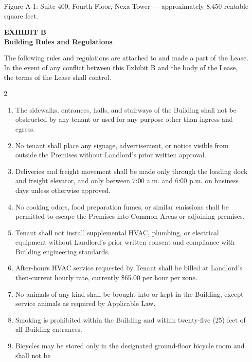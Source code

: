 \documentclass[10pt,a4paper]{scrreprt}
\newcommand{\exhibitheading}[2]{%
  \vspace{8pt}%
  \noindent\begin{tcolorbox}[colback=leasepaper,colframe=leasenavy,boxrule=1pt,arc=0pt,
    left=12pt,right=12pt,top=5pt,bottom=5pt,before skip=0pt,after skip=0pt]
    {\color{leasegold}\bfseries EXHIBIT #1}\\[1pt]
    {\color{leasenavy}\LARGE\bfseries #2}
  \end{tcolorbox}
  \vspace{4pt}%
}
\begin{document}
\vspace{-6pt}
\begin{center}
\small\color{leaseslate} Figure A-1: Suite 400, Fourth Floor, Nexa Tower --- approximately
8{,}450 rentable square feet.
\end{center}

\exhibitheading{B}{Building Rules and Regulations}

The following rules and regulations are attached to and made a part of the Lease. In the event
of any conflict between this Exhibit B and the body of the Lease, the terms of the Lease shall
control.

\begin{multicols}{2}
\begin{enumerate}[leftmargin=*,itemsep=2pt,label=\arabic*.]
\item The sidewalks, entrances, halls, and stairways of the Building shall not be obstructed by
  any tenant or used for any purpose other than ingress and egress.
\item No tenant shall place any signage, advertisement, or notice visible from outside the
  Premises without Landlord's prior written approval.
\item Deliveries and freight movement shall be made only through the loading dock and freight
  elevator, and only between 7:00 a.m. and 6:00 p.m. on business days unless otherwise approved.
\item No cooking odors, food preparation fumes, or similar emissions shall be permitted to
  escape the Premises into Common Areas or adjoining premises.
\item Tenant shall not install supplemental HVAC, plumbing, or electrical equipment without
  Landlord's prior written consent and compliance with Building engineering standards.
\item After-hours HVAC service requested by Tenant shall be billed at Landlord's then-current
  hourly rate, currently \$65.00 per hour per zone.
\item No animals of any kind shall be brought into or kept in the Building, except service
  animals as required by Applicable Law.
\item Smoking is prohibited within the Building and within twenty-five (25) feet of all
  Building entrances.
\item Bicycles may be stored only in the designated ground-floor bicycle room and shall not be

\end{enumerate}
\end{multicols}
\end{document}
